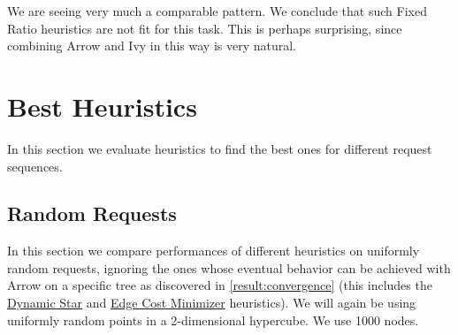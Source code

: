 \documentclass[a4paper, oneside]{discothesis}
\begin{document}

We are seeing very much a comparable pattern. We conclude that such Fixed Ratio heuristics are not fit for this task. This is perhaps surprising, since combining Arrow and Ivy in this way is very natural.

\section{Best Heuristics}

In this section we evaluate heuristics to find the best ones for different request sequences.

\subsection{Random Requests}\label{result:algs}

In this section we compare performances of different heuristics on uniformly random requests, ignoring the ones whose eventual behavior can be achieved with Arrow on a specific tree as discovered in \autoref{result:convergence} (this includes the \hyperref[alg:dynstar]{Dynamic Star} and \hyperref[alg:ecm]{Edge Cost Minimizer} heuristics). We will again be using uniformly random points in a 2-dimensional hypercube. We use 1000 nodes.
\end{document}
